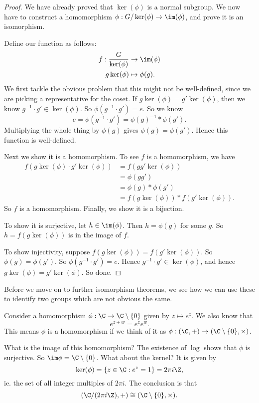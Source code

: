 \documentclass[a4paper]{article}
\begin{document}
\begin{proof}
  We have already proved that $\ker (\phi)$ is a normal subgroup. We now have to construct a homomorphism $\phi: G/\ker(\phi) \to \im (\phi)$, and prove it is an isomorphism.

  Define our function as follows:
  \begin{align*}
    f: \frac{G}{\ker (\phi)} &\to \im (\phi)\\
    g\ker (\phi) &\mapsto \phi(g).
  \end{align*}
  We first tackle the obvious problem that this might not be well-defined, since we are picking a representative for the coset. If $g \ker(\phi) = g' \ker(\phi)$, then we know $g^{-1} \cdot g' \in \ker(\phi)$. So $\phi(g^{-1} \cdot g') = e$. So we know
  \[
    e = \phi(g^{-1} \cdot g') = \phi(g)^{-1} * \phi(g').
  \]
  Multiplying the whole thing by $\phi(g)$ gives $\phi(g) = \phi(g')$. Hence this function is well-defined.

  Next we show it is a homomorphism. To see $f$ is a homomorphism, we have
  \begin{align*}
    f(g\ker (\phi) \cdot g'\ker(\phi)) &= f(gg'\ker(\phi)) \\
    &= \phi(gg') \\
    &= \phi(g) * \phi(g') \\
    &= f(g\ker(\phi)) * f(g'\ker(\phi)).
  \end{align*}
  So $f$ is a homomorphism. Finally, we show it is a bijection.

  To show it is surjective, let $h \in \im (\phi)$. Then $h = \phi(g)$ for some $g$. So $h = f(g\ker (\phi))$ is in the image of $f$.

  To show injectivity, suppose $f(g\ker (\phi)) = f(g'\ker(\phi))$. So $\phi(g) = \phi(g')$. So $\phi(g^{-1} \cdot g') = e$. Hence $g^{-1} \cdot g' \in \ker(\phi)$, and hence $g \ker(\phi) = g'\ker(\phi)$. So done.
\end{proof}

Before we move on to further isomorphism theorems, we see how we can use these to identify two groups which are not obvious the same.

\begin{eg}
  Consider a homomorphism $\phi: \C \to \C\setminus \{0\}$ given by $z \mapsto e^z$. We also know that
  \[
    e^{z + w} = e^z e^w.
  \]
  This means $\phi$ is a homomorphism if we think of it as $\phi: (\C, +) \to (\C\setminus \{0\}, \times)$.

  What is the image of this homomorphism? The existence of $\log$ shows that $\phi$ is surjective. So $\im \phi = \C\setminus \{0\}$. What about the kernel? It is given by
  \[
    \ker(\phi) = \{z \in \C: e^z = 1\} = 2\pi i \Z,
  \]
  ie. the set of all integer multiples of $2\pi i$. The conclusion is that
  \[
    (\C / (2\pi i \Z), +) \cong (\C\setminus \{0\}, \times).
  \]
\end{eg}
\end{document}
